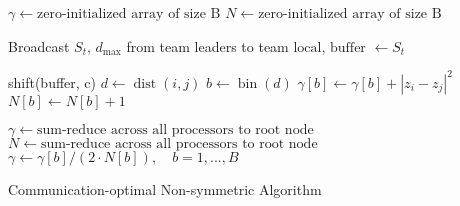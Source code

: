 \begin{algorithm}[H]
 \DontPrintSemicolon

 
 $\gamma \gets \text{zero-initialized array of size B}$ \;
 $N \gets \text{zero-initialized array of size B}$ \;
  
 
 Broadcast $S_t$, $d_{\max}$ from team leaders to team \;
 $\text{local}$, $\text{buffer}$ $\gets S_t$
 
  {
    shift(buffer, c) \;
	{
        $d \gets \operatorname{dist}(i, j)$ \;
        $b \gets \operatorname{bin}(d)$ \;
		$\gamma[b] \gets \gamma[b] + |z_i - z_j|^2$ \;
		$N[b] \gets N[b] + 1$ \;
	}
 }
 
 $\gamma \gets \text{sum-reduce across all processors to root node}$ \;
 $N \gets \text{sum-reduce across all processors to root node}$ \;
 $\gamma \gets \gamma[b] / (2 \cdot N[b]), \quad b = 1, ..., B$\;
 \caption{Communication-optimal Non-symmetric Algorithm}
 \label{alg:commopt}
\end{algorithm}